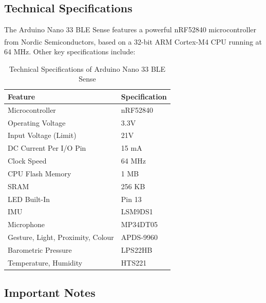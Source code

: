 	\subsection{Technical Specifications}
	
	The Arduino Nano 33 BLE Sense features a powerful nRF52840 microcontroller from Nordic Semiconductors, based on a 32-bit ARM\textsuperscript{\textregistered} Cortex\texttrademark-M4 CPU running at 64 MHz. Other key specifications include:
	
	\begin{table}[h!]
		\centering
		\begin{tabular}{|l|l|}
			\hline
			\textbf{Feature}                 & \textbf{Specification} \\
			\hline
			Microcontroller                  & nRF52840                     \\
			Operating Voltage                & 3.3V                        \\
			Input Voltage (Limit)            & 21V                         \\
			DC Current Per I/O Pin           & 15 mA                       \\
			Clock Speed                      & 64 MHz                      \\
			CPU Flash Memory                 & 1 MB                        \\
			SRAM                             & 256 KB                      \\
			LED Built-In                     & Pin 13                      \\
			IMU                              & LSM9DS1                     \\
			Microphone                       & MP34DT05                    \\
			Gesture, Light, Proximity, Colour & APDS-9960                   \\
			Barometric Pressure              & LPS22HB                     \\
			Temperature, Humidity            & HTS221                      \\
			\hline
		\end{tabular}
		\caption{Technical Specifications of Arduino Nano 33 BLE Sense \cite{ArduinoNano33Sense2025}}
	\end{table}
	
	\subsection{Important Notes}
	
